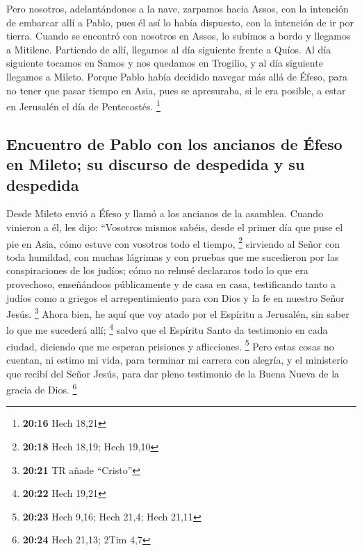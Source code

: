  Pero nosotros, adelantándonos a la nave, zarpamos hacia
Assos, con la intención de embarcar allí a Pablo, pues él así lo había
dispuesto, con la intención de ir por tierra.  Cuando se
encontró con nosotros en Assos, lo subimos a bordo y llegamos a
Mitilene.  Partiendo de allí, llegamos al día siguiente
frente a Quíos. Al día siguiente tocamos en Samos y nos quedamos en
Trogilio, y al día siguiente llegamos a Mileto.  Porque
Pablo había decidido navegar más allá de Éfeso, para no tener que pasar
tiempo en Asia, pues se apresuraba, si le era posible, a estar en
Jerusalén el día de Pentecostés. \footnote{\textbf{20:16} Hech 18,21}

\hypertarget{encuentro-de-pablo-con-los-ancianos-de-uxe9feso-en-mileto-su-discurso-de-despedida-y-su-despedida}{%
\subsection{Encuentro de Pablo con los ancianos de Éfeso en Mileto; su
discurso de despedida y su
despedida}\label{encuentro-de-pablo-con-los-ancianos-de-uxe9feso-en-mileto-su-discurso-de-despedida-y-su-despedida}}

 Desde Mileto envió a Éfeso y llamó a los ancianos de la
asamblea.  Cuando vinieron a él, les dijo: ``Vosotros
mismos sabéis, desde el primer día que puse el pie en Asia, cómo estuve
con vosotros todo el tiempo, \footnote{\textbf{20:18} Hech 18,19; Hech
  19,10}  sirviendo al Señor con toda humildad, con
muchas lágrimas y con pruebas que me sucedieron por las conspiraciones
de los judíos;  cómo no rehusé declararos todo lo que era
provechoso, enseñándoos públicamente y de casa en casa, 
testificando tanto a judíos como a griegos el arrepentimiento para con
Dios y la fe en nuestro Señor Jesús. \footnote{\textbf{20:21} TR añade
  ``Cristo''}  Ahora bien, he aquí que voy atado por el
Espíritu a Jerusalén, sin saber lo que me sucederá allí; \footnote{\textbf{20:22}
  Hech 19,21}  salvo que el Espíritu Santo da testimonio
en cada ciudad, diciendo que me esperan prisiones y aflicciones.
\footnote{\textbf{20:23} Hech 9,16; Hech 21,4; Hech 21,11}
 Pero estas cosas no cuentan, ni estimo mi vida, para
terminar mi carrera con alegría, y el ministerio que recibí del Señor
Jesús, para dar pleno testimonio de la Buena Nueva de la gracia de Dios.
\footnote{\textbf{20:24} Hech 21,13; 2Tim 4,7}

